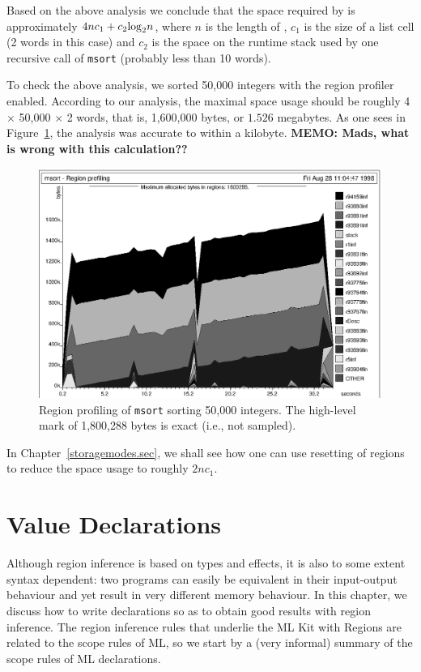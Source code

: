 \documentclass[12pt]{book}
\begin{document}
Based on the above analysis we conclude that the space required by
 is approximately $4nc_1+c_2{\rm log}_2n$, where $n$ is 
the length of , $c_1$ is the size of a list cell (2 words in this
case) and $c_2$ is the space on the runtime stack used by one recursive call
of {\tt msort} (probably less than 10 words). 

To check the above analysis, we sorted 50,000 integers with the region profiler
enabled. According to our
analysis, the maximal space usage should be roughly 4 $\times$ 50,000 $\times$ 2
words, that is, 1,600,000 bytes, or $1.526$ megabytes. 
As one sees in  Figure~\ref{msort.fig}, the analysis was accurate to within a
kilobyte. 
{\Large \bf MEMO: Mads, what is wrong with this calculation??}

\begin{figure}[t]
\begin{center}
\includegraphics{msort.ps}
\end{center}
\caption{Region profiling of {\tt msort} sorting 50,000
integers. The high-level mark of 1,800,288 bytes is exact (i.e., not sampled).}
\label{msort.fig}
\end{figure}

In Chapter~\ref{storagemodes.sec}, we shall see how one can use resetting of
regions to reduce the space usage to roughly $2nc_1$.

\chapter{Value Declarations}
\label{valdecl.sec}

Although region inference is based on types and effects, it is also
to some extent syntax dependent: two programs can easily be equivalent
in their input-output behaviour and yet result in very different memory
behaviour. In this chapter, we discuss how to write 
declarations so as
to obtain good results with region inference. The region inference rules
that underlie the ML Kit with Regions are related to the scope rules of
ML, so we start by a (very informal) summary of the scope rules of ML declarations.
\end{document}
